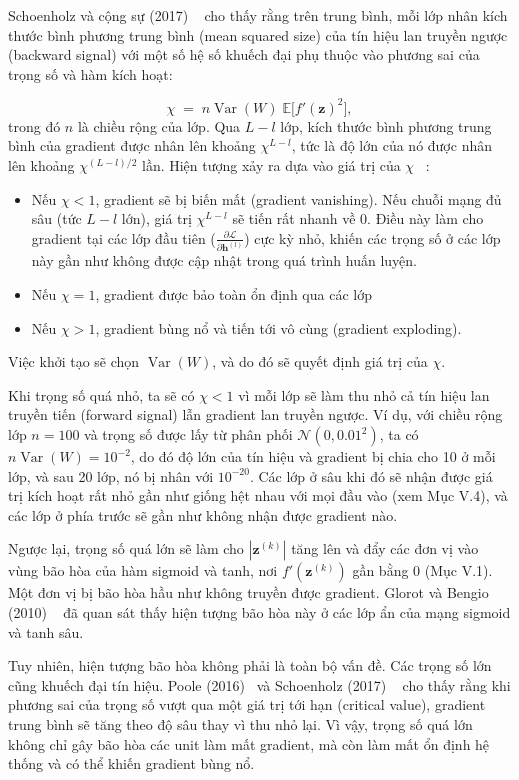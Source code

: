 \documentclass[12pt]{article}
\begin{document}
Schoenholz và cộng sự (2017) ~\cite[\S4]{long-schoenholz2017} cho thấy rằng trên trung bình, mỗi lớp nhân kích thước bình phương trung bình (mean squared size) của tín hiệu lan truyền ngược (backward signal) với một số hệ số khuếch đại phụ thuộc vào phương sai của trọng số và hàm kích hoạt:

\[  \chi \;=\; n \operatorname{Var}(W)\; \mathbb{E}\big[ f'(\mathbf{z})^2 \big], \]
trong đó $n$ là chiều rộng của lớp. Qua $L - l$ lớp, kích thước bình phương trung bình của gradient được nhân lên khoảng $\chi^{L - l}$, tức là độ lớn của nó được nhân lên khoảng $\chi^{(L - l)/2}$ lần. Hiện tượng xảy ra dựa vào giá trị của $\chi$ ~\cite[\S4]{long-schoenholz2017}:
\begin{itemize}
    \item Nếu $\chi < 1$, gradient sẽ bị biến mất (gradient vanishing). Nếu chuỗi mạng đủ sâu (tức $L - l$ lớn), giá trị $\chi^{L-l}$ sẽ tiến rất nhanh về 0. Điều này làm cho gradient tại các lớp đầu tiên ($\frac{\partial \mathcal{L}}{\partial \mathbf{h}^{(l)}}$) cực kỳ nhỏ, khiến các trọng số ở các lớp này gần như không được cập nhật trong quá trình huấn luyện.
    \item Nếu $\chi = 1$, gradient được bảo toàn ổn định qua các lớp
    \item Nếu $\chi > 1$, gradient bùng nổ và tiến tới vô cùng (gradient exploding).
\end{itemize}
Việc khởi tạo sẽ chọn $\operatorname{Var}(W)$, và do đó sẽ quyết định giá trị của $\chi$.

Khi trọng số quá nhỏ, ta sẽ có $\chi < 1$ vì mỗi lớp sẽ làm thu nhỏ cả tín hiệu lan truyền tiến (forward signal) lẫn gradient lan truyền ngược. Ví dụ, với chiều rộng lớp $n = 100$ và trọng số được lấy từ phân phối $\mathcal{N}(0, 0.01^2)$, ta có $n \operatorname{Var}(W) = 10^{-2}$, do đó độ lớn của tín hiệu và gradient bị chia cho 10 ở mỗi lớp, và sau 20 lớp, nó bị nhân với $10^{-20}$. Các lớp ở sâu khi đó sẽ nhận được giá trị kích hoạt rất nhỏ gần như giống hệt nhau với mọi đầu vào (xem Mục V.4), và các lớp ở phía trước sẽ gần như không nhận được gradient nào.

Ngược lại, trọng số quá lớn sẽ làm cho $|\mathbf{z}^{(k)}|$ tăng lên và đẩy các đơn vị vào vùng bão hòa của hàm sigmoid và tanh, nơi $f'(\mathbf{z}^{(k)})$ gần bằng 0 (Mục V.1). Một đơn vị bị bão hòa hầu như không truyền được gradient. Glorot và Bengio (2010) ~\cite{glorot2010} đã quan sát thấy hiện tượng bão hòa này ở các lớp ẩn của mạng sigmoid và tanh sâu.

Tuy nhiên, hiện tượng bão hòa không phải là toàn bộ vấn đề. Các trọng số lớn cũng khuếch đại tín hiệu. Poole (2016)~\cite{poole2016} và Schoenholz (2017) ~\cite{long-schoenholz2017} cho thấy rằng khi phương sai của trọng số vượt qua một giá trị tới hạn (critical value), gradient trung bình sẽ tăng theo độ sâu thay vì thu nhỏ lại. Vì vậy, trọng số quá lớn không chỉ gây bão hòa các unit làm mất gradient, mà còn làm mất ổn định hệ thống và có thể khiến gradient bùng nổ.
\end{document}
